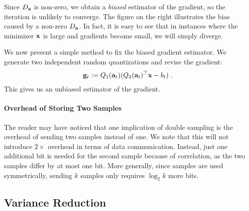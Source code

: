 \documentclass{article}
\def\a{{\bf a}}
\def\g{{\bf g}}
\def\x{{\bf x}}
\begin{document}
Since $D_{\a}$ is non-zero, we obtain a \emph{biased} estimator of the gradient, so the iteration is unlikely to converge. 
The figure on the right illustrates the bias caused by a non-zero $D_{\a}$. In fact, it is easy to see that in instances where the minimizer $\x$ is large and gradients become small, we will simply diverge. 

We now present a simple method to fix the biased gradient estimator. We generate two independent random quantizations and revise the gradient:
\begin{align}
\g_t := Q_1 (\a_t) (Q_2 (\a_t)^\top \x - b_t) \; .
\label{eq:double}
\end{align}
This gives us an unbiased estimator of the gradient. 

\paragraph*{Overhead of Storing Two Samples}
The reader may have noticed that one implication of double sampling is the overhead of sending
two samples instead of one. We note that this will not introduce $2\times$
overhead in terms of data communication. Instead, just one additional bit
is needed for the second sample because of correlation, as the two samples 
differ by at most one bit. More generally, since samples
are used symmetrically, sending $k$ samples only requires $\log_2 k$ more bits.

\subsection{Variance Reduction}
\end{document}
